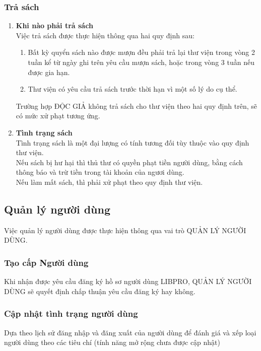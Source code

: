\documentclass[12pt,a4paper]{report}
\begin{document}
			\subsubsection{Trả sách}
				\begin{enumerate}
				\item \textbf{Khi nào phải trả sách}\\
					Việc trả sách được thực hiện thông qua hai quy định sau:
					\begin{enumerate}
						\item Bất kỳ quyển sách nào được mượn đều phải trả lại thư viện trong vòng 2 tuần kể từ ngày ghi trên yêu cầu mượn sách, hoặc trong vòng 3 tuần nếu được gia hạn.\\
						\item Thư viện có yêu cầu trả sách trước thời hạn vì một số lý do cụ thể.
					\end{enumerate}
					Trường hợp ĐỘC GIẢ không trả sách cho thư viện theo hai quy định trên, sẽ có mức xử phạt tương ứng.\\
				\item \textbf{Tình trạng sách}\\
					Tình trạng sách là một đại lượng có tính tương đối tùy thuộc vào quy định thư viện.\\
					Nếu sách bị hư hại thì thủ thư có quyền phạt tiền người dùng, bằng cách thông báo và trừ tiền trong tài khoản của ngươi dùng.\\
					Nếu làm mất sách, thì phải xử phạt theo quy định thư viện.\\
				\end{enumerate}
		\subsection{Quản lý người dùng}
		Việc quản lý người dùng được thực hiện thông qua vai trò QUẢN LÝ NGƯỜI DÙNG.\\
			\subsubsection{Tạo cấp Người dùng}
			Khi nhận được yêu cầu đăng ký hồ sơ người dùng LIBPRO, QUẢN LÝ NGƯỜI DÙNG sẽ quyết định chấp thuận yêu cầu đăng ký hay không.\\

			\subsubsection{Cập nhật tình trạng người dùng}
			Dựa theo lịch sử đăng nhập và đăng xuất của người dùng để đánh giá và xếp loại người dùng theo các tiêu chí (tính năng mở rộng chưa được cập nhật)\\ %
\end{document}
